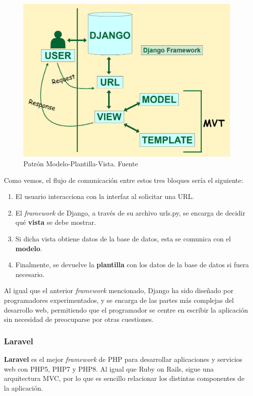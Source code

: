         \begin{figure}[H]
            \centering
            \includegraphics[scale=0.22]{imagenes/mvt.png}
            \caption[Patrón Modelo-Plantilla-Vista]{Patrón Modelo-Plantilla-Vista. Fuente \cite{mvt}}
            \label{fig:mvt}
        \end{figure}

    Como vemos, el flujo de comunicación entre estos tres bloques sería el siguiente:
        
       \begin{enumerate}
           \item El usuario interacciona con la interfaz al solicitar una URL.
           \item El \textit{framework} de Django, a través de su archivo urls.py, se encarga
           de decidir qué \textbf{vista} se debe mostrar.
           \item Si dicha vista obtiene datos de la base de datos, esta se comunica con el 
           \textbf{modelo}.
           \item Finalmente, se devuelve la \textbf{plantilla} con los datos de la base de
           datos si fuera necesario.
       \end{enumerate}

    Al igual que el anterior \textit{framework} mencionado, Django ha sido diseñado por
    programadores experimentados, y se encarga de las partes más complejas del desarrollo
    web, permitiendo que el programador se centre en escribir la aplicación sin necesidad
    de preocuparse por otras cuestiones.

    \subsubsection{Laravel}
    \textbf{Laravel} \cite{laravel} es el mejor \textit{framework} de PHP para desarrollar
    aplicaciones y servicios web con PHP5, PHP7 y PHP8. Al igual que Ruby on Rails, sigue
    una arquitectura MVC, por lo que es sencillo relacionar los distintas componentes de la
    aplicación.\\

